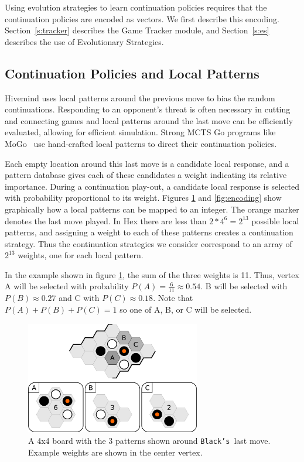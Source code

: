 \documentclass{acm_proc_article-sp}
\newcommand{\hblacks}{\texttt{Black's}}
\begin{document}
Using evolution strategies to learn continuation policies requires that the continuation policies are encoded as vectors.
We first describe this encoding.  Section~\ref{s:tracker} describes the Game Tracker module, and Section~\ref{s:es} describes the
use of Evolutionary Strategies.

\subsection{Continuation Policies and Local Patterns}
\label{s:policies}

Hivemind uses local patterns around the previous move to bias the random continuations.
Responding to an opponent's threat is often necessary in cutting and connecting games
and local patterns around the last move can be efficiently evaluated, allowing for efficient simulation.
Strong MCTS Go programs like MoGo~\cite{gelly2006modification} use hand-crafted local patterns to direct their  continuation policies.

Each empty location around this last move is a candidate local response, and a pattern database gives each of these candidates a
weight indicating its relative importance.
During a continuation play-out, a candidate local response is selected with probability proportional to its weight.
Figures \ref{fig:localpattern} and \ref{fig:encoding} show graphically how a local patterns can be mapped to an integer. 
The orange marker denotes the last move played. 
In Hex there are less than $2 * 4^6=2^{13}$ possible local patterns, and 
assigning a weight to each of these patterns creates a continuation strategy.
Thus the continuation strategies we consider correspond to an array of $2^{13}$ weights, one for each local pattern.

In the example shown in figure \ref{fig:localpattern}, the sum of the three weights is 11. Thus, vertex A will be selected with probability $P(A) = \frac{6}{11} \approx 0.54$. 
B will be selected with $P(B) \approx 0.27$ and C with $P(C) \approx 0.18$. 
Note that $P(A)+P(B)+P(C) = 1$ so one of A, B, or C will be selected. 

\begin{figure}
	\begin{center}
	\includegraphics[width=3.0in]{graphics/local-pattern.pdf}
	\caption{A 4x4 board with the 3 patterns shown around \hblacks\ last move. Example weights are shown in the center vertex.}
	\label{fig:localpattern}
	\end{center}
\end{figure}
\end{document}
